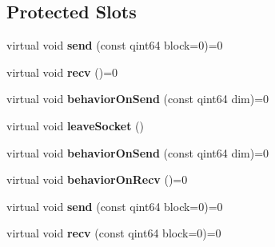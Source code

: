 \subsection*{Protected Slots}
\begin{DoxyCompactItemize}
\item 
\hypertarget{class_k_cloud_1_1_net_object_a43937ecaf65749a2c44e5c1c7a0d17dc}{virtual void {\bfseries send} (const qint64 block=0)=0}\label{class_k_cloud_1_1_net_object_a43937ecaf65749a2c44e5c1c7a0d17dc}

\item 
\hypertarget{class_k_cloud_1_1_net_object_a8ce9c6148bb53529b2b23d72bfe69e00}{virtual void {\bfseries recv} ()=0}\label{class_k_cloud_1_1_net_object_a8ce9c6148bb53529b2b23d72bfe69e00}

\item 
\hypertarget{class_k_cloud_1_1_net_object_ab2485b3e091565ade1f299ccff48ab5a}{virtual void {\bfseries behavior\-On\-Send} (const qint64 dim)=0}\label{class_k_cloud_1_1_net_object_ab2485b3e091565ade1f299ccff48ab5a}

\item 
\hypertarget{class_k_cloud_1_1_net_object_a6d1a31ad0d46aebc29940737c288234a}{virtual void {\bfseries leave\-Socket} ()}\label{class_k_cloud_1_1_net_object_a6d1a31ad0d46aebc29940737c288234a}

\item 
\hypertarget{class_k_cloud_1_1_net_object_ab2485b3e091565ade1f299ccff48ab5a}{virtual void {\bfseries behavior\-On\-Send} (const qint64 dim)=0}\label{class_k_cloud_1_1_net_object_ab2485b3e091565ade1f299ccff48ab5a}

\item 
\hypertarget{class_k_cloud_1_1_net_object_a279c1450bcc18bf4620bb6e2a28184a4}{virtual void {\bfseries behavior\-On\-Recv} ()=0}\label{class_k_cloud_1_1_net_object_a279c1450bcc18bf4620bb6e2a28184a4}

\item 
\hypertarget{class_k_cloud_1_1_net_object_a43937ecaf65749a2c44e5c1c7a0d17dc}{virtual void {\bfseries send} (const qint64 block=0)=0}\label{class_k_cloud_1_1_net_object_a43937ecaf65749a2c44e5c1c7a0d17dc}

\item 
\hypertarget{class_k_cloud_1_1_net_object_a364640f61d8bda507681e120ca667fa9}{virtual void {\bfseries recv} (const qint64 block=0)=0}\label{class_k_cloud_1_1_net_object_a364640f61d8bda507681e120ca667fa9}

\end{DoxyCompactItemize}
